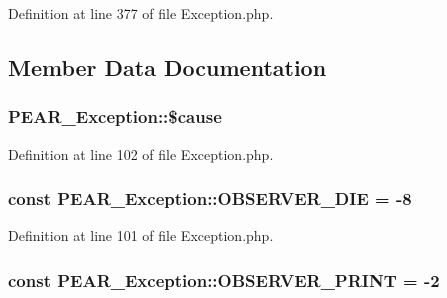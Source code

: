 Definition at line 377 of file Exception.\+php.



\subsection{Member Data Documentation}
\subsubsection[{\texorpdfstring{\$cause}{$cause}}]{\setlength{\rightskip}{0pt plus 5cm}P\+E\+A\+R\+\_\+\+Exception\+::\$cause\hspace{0.3cm}{\ttfamily [protected]}}\hypertarget{classPEAR__Exception_a7570906af734c282bcde649449bdbfdb}{}\label{classPEAR__Exception_a7570906af734c282bcde649449bdbfdb}


Definition at line 102 of file Exception.\+php.

\subsubsection[{\texorpdfstring{O\+B\+S\+E\+R\+V\+E\+R\+\_\+\+D\+IE}{OBSERVER_DIE}}]{\setlength{\rightskip}{0pt plus 5cm}const P\+E\+A\+R\+\_\+\+Exception\+::\+O\+B\+S\+E\+R\+V\+E\+R\+\_\+\+D\+IE = -\/8}\hypertarget{classPEAR__Exception_ad3ee7214450c1e14de99dbde12b8a60c}{}\label{classPEAR__Exception_ad3ee7214450c1e14de99dbde12b8a60c}


Definition at line 101 of file Exception.\+php.

\subsubsection[{\texorpdfstring{O\+B\+S\+E\+R\+V\+E\+R\+\_\+\+P\+R\+I\+NT}{OBSERVER_PRINT}}]{\setlength{\rightskip}{0pt plus 5cm}const P\+E\+A\+R\+\_\+\+Exception\+::\+O\+B\+S\+E\+R\+V\+E\+R\+\_\+\+P\+R\+I\+NT = -\/2}\hypertarget{classPEAR__Exception_afaa71d35f3fab453da2cef325b210423}{}\label{classPEAR__Exception_afaa71d35f3fab453da2cef325b210423}


